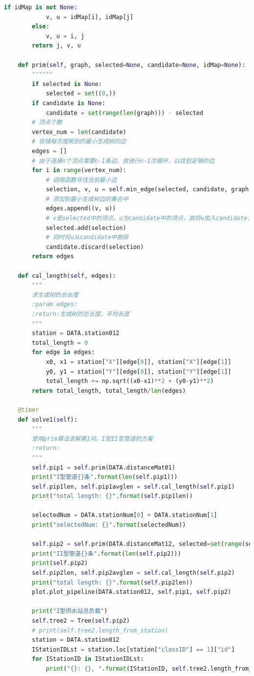 \documentclass{cumcmthesis}
\begin{document}
\begin{appendices}
\begin{lstlisting}[language=python]
        if idMap is not None:
            v, u = idMap[i], idMap[j]
        else:
            v, u = i, j
        return j, v, u

    def prim(self, graph, selected=None, candidate=None, idMap=None):
        """"""
        if selected is None:
            selected = set((0,))
        if candidate is None:
            candidate = set(range(len(graph))) - selected
        # 顶点个数
        vertex_num = len(candidate)
        # 存储每次搜索到的最小生成树的边
        edges = []
        # 由于连接n个顶点需要n-1条边，故进行n-1次循环，以找到足够的边
        for i in range(vertex_num):
            # 调用函数寻找当前最小边
            selection, v, u = self.min_edge(selected, candidate, graph, idMap=idMap)
            # 添加到最小生成树边的集合中
            edges.append((v, u))
            # v是selected中的顶点，u为candidate中的顶点，故将u加入candidate，以代表已经选择该顶点
            selected.add(selection)
            # 同时将u从candidate中删除
            candidate.discard(selection)
        return edges

    def cal_length(self, edges):
        """
        求生成树的总长度
        :param edges:
        :return:生成树的总长度，平均长度
        """
        station = DATA.station012
        total_length = 0
        for edge in edges:
            x0, x1 = station["X"][edge[0]], station["X"][edge[1]]
            y0, y1 = station["Y"][edge[0]], station["Y"][edge[1]]
            total_length += np.sqrt((x0-x1)**2 + (y0-y1)**2)
        return total_length, total_length/len(edges)

    @timer
    def solve1(self):
        """
        使用prim算法求解第1问，I型II型管道的方案
        :return:
        """
        self.pip1 = self.prim(DATA.distanceMat01)
        print("I型管道{}条".format(len(self.pip1)))
        self.pip1len, self.pip1avglen = self.cal_length(self.pip1)
        print("total length: {}".format(self.pip1len))

        selectedNum = DATA.stationNum[0] + DATA.stationNum[1]
        print("selectedNum: {}".format(selectedNum))

        self.pip2 = self.prim(DATA.distanceMat12, selected=set(range(selectedNum)))
        print("II型管道{}条".format(len(self.pip2)))
        print(self.pip2)
        self.pip2len, self.pip2avglen = self.cal_length(self.pip2)
        print("total length: {}".format(self.pip2len))
        plot.plot_pipeline(DATA.station012, self.pip1, self.pip2)

        print("I型供水站总负载")
        self.tree2 = Tree(self.pip2)
        # print(self.tree2.length_from_station)
        station = DATA.station012
        IStationIDLst = station.loc[station["classID"] == 1]["id"]
        for IStationID in IStationIDLst:
            print("{}: {}, ".format(IStationID, self.tree2.length_from_station[IStationID]))


\end{lstlisting}
\end{appendices}
\end{document}
